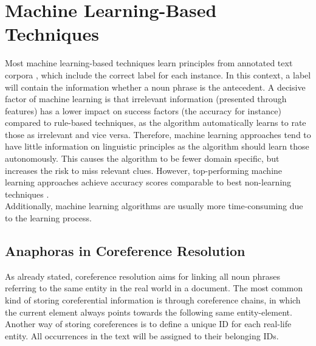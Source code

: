 \section{Machine Learning-Based Techniques}

Most machine learning-based techniques learn principles from annotated text corpora \citep{soon2001machine, bergsma2005automatic}, which include the correct label for each instance. In this context, a label will contain the information whether a noun phrase is the antecedent. A decisive factor of machine learning is that irrelevant information (presented through features) has a lower impact on success factors (the accuracy for instance) compared to rule-based techniques, as the algorithm automatically learns to rate those as irrelevant and vice versa. Therefore, machine learning approaches tend to have little information on linguistic principles as the algorithm should learn those autonomously. This causes the algorithm to be fewer domain specific, but increases the risk to miss relevant clues. However, top-performing machine learning approaches achieve accuracy scores comparable to best non-learning techniques \citep{soon2001machine}. \\
Additionally, machine learning algorithms are usually more time-consuming due to the learning process.

\subsection{Anaphoras in Coreference Resolution}
\label{soon2001traininginstances} %

As already stated, coreference resolution aims for linking all noun phrases referring to the same entity in the real world in a document. The most common kind of storing coreferential information is through coreference chains, in which the current element always points towards the following same entity-element. Another way of storing coreferences is to define a unique ID for each real-life entity. All occurrences in the text will be assigned to their belonging IDs.

